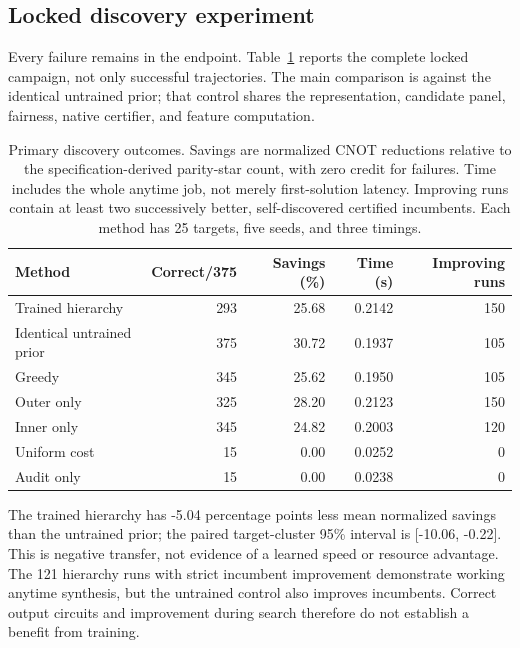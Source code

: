 \subsection{Locked discovery experiment}

Every failure remains in the endpoint. Table~\ref{tab:primary} reports the complete locked campaign, not only successful trajectories. The main comparison is against the identical untrained prior; that control shares the representation, candidate panel, fairness, native certifier, and feature computation.

\begin{table}[htbp]\centering\small

\begin{tabular}{@{}lrrrr@{}}\toprule

Method & Correct/375 & Savings (\%) & Time (s) & Improving runs \\\midrule

Trained hierarchy & 293 & 25.68 & 0.2142 & 150 \\

Identical untrained prior & 375 & 30.72 & 0.1937 & 105 \\

Greedy & 345 & 25.62 & 0.1950 & 105 \\

Outer only & 325 & 28.20 & 0.2123 & 150 \\

Inner only & 345 & 24.82 & 0.2003 & 120 \\

Uniform cost & 15 & 0.00 & 0.0252 & 0 \\

Audit only & 15 & 0.00 & 0.0238 & 0 \\

\bottomrule\end{tabular}

\caption{Primary discovery outcomes. Savings are normalized CNOT reductions relative to the specification-derived parity-star count, with zero credit for failures. Time includes the whole anytime job, not merely first-solution latency. Improving runs contain at least two successively better, self-discovered certified incumbents. Each method has 25 targets, five seeds, and three timings.}\label{tab:primary}\end{table}

The trained hierarchy has -5.04 percentage points less mean normalized savings than the untrained prior; the paired target-cluster 95\% interval is [-10.06, -0.22]. This is negative transfer, not evidence of a learned speed or resource advantage. The 121 hierarchy runs with strict incumbent improvement demonstrate working anytime synthesis, but the untrained control also improves incumbents. Correct output circuits and improvement during search therefore do not establish a benefit from training.

